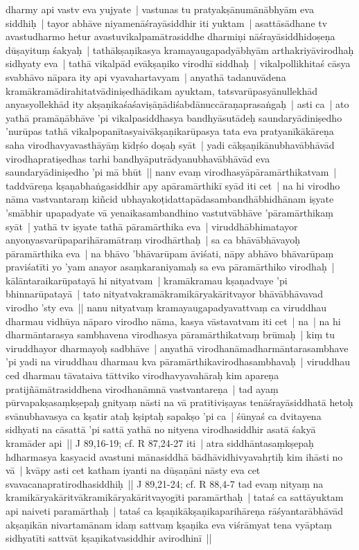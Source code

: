 \documentclass[article,12pt,a4paper]{memoir}%
\newcounter{parCount}
\begin{document}
dharmy api vastv eva yujyate | \label{thakur75-93.19} vastunas tu pratyakṣānumānābhyām eva siddhiḥ | tayor abhāve niyamenāśrayāsiddhir iti yuktam | asattāsādhane tv avastudharmo hetur avastuvikalpamātrasiddhe dharmiṇi nāśrayāsiddhidoṣeṇa dūṣayituṃ śakyaḥ | tathākṣaṇikasya kramayaugapadyābhyām arthakriyāvirodhaḥ sidhyaty eva | \label{thakur75-93.22} tathā vikalpād evākṣaṇiko virodhī siddhaḥ | vikalpollikhitaś cāsya svabhāvo nāpara ity api vyavahartavyam | anyathā tadanuvādena kramākramādirahitatvādiniṣedhādikam ayuktam, tatsvarūpasyānullekhād anyasyollekhād ity akṣaṇikaśaśaviṣāṇādiśabdānuccāraṇaprasaṅgaḥ | asti ca | ato yathā pramāṇābhāve 'pi vikalpasiddhasya bandhyāsutādeḥ saundaryādiniṣedho 'nurūpas tathā vikalpopanītasyaivākṣaṇikarūpasya tata eva pratyanīkākāreṇa saha virodhavyavasthāyāṃ kīdṛśo doṣaḥ syāt | yadi cākṣaṇikānubhavābhāvād virodhapratiṣedhas tarhi bandhyāputrādyanubhavābhāvād eva saundaryādiniṣedho 'pi mā bhūt || \label{thakur75-94.5} nanv evaṃ virodhasyāpāramārthikatvam | taddvāreṇa kṣaṇabhaṅgasiddhir apy apāramārthikī syād iti cet | \label{thakur75-94.6} na hi virodho nāma vastvantaraṃ kiñcid ubhayakoṭidattapādasambandhābhidhānam iṣyate 'smābhir upapadyate vā yenaikasambandhino vastutvābhāve 'pāramārthikaṃ syāt | yathā tv iṣyate tathā pāramārthika eva | viruddhābhimatayor anyonyasvarūpaparihāramātraṃ virodhārthaḥ | sa ca bhāvābhāvayoḥ pāramārthika eva | na bhāvo 'bhāvarūpam āviśati, nāpy abhāvo bhāvarūpaṃ praviśatīti yo 'yam anayor asaṃkaraniyamaḥ sa eva pāramārthiko virodhaḥ | kālāntaraikarūpatayā hi nityatvam | kramākramau kṣaṇadvaye 'pi bhinnarūpatayā | tato nityatvakramākramikāryakāritvayor bhāvābhāvavad virodho 'sty eva || \label{thakur75-94.14} nanu nityatvaṃ kramayaugapadyavattvaṃ ca viruddhau dharmau vidhūya nāparo virodho nāma, kasya vāstavatvam iti cet | \label{thakur75-94.15} na | na hi dharmāntarasya sambhavena virodhasya pāramārthikatvaṃ brūmaḥ | kiṃ tu viruddhayor dharmayoḥ sadbhāve | anyathā virodhanāmadharmāntarasambhave 'pi yadi na viruddhau dharmau kva pāramārthikavirodhasambhavaḥ | viruddhau ced dharmau tāvataiva tāttviko virodhavyavahāraḥ kim apareṇa pratijñāmātrasiddhena virodhanāmnā vastvantareṇa | \label{thakur75-94.20} tad ayaṃ pūrvapakṣasaṃkṣepaḥ gnityaṃ nāsti na vā pratītiviṣayas tenāśrayāsiddhatā hetoḥ svānubhavasya ca kṣatir ataḥ kṣiptaḥ sapakṣo 'pi ca | śūnyaś ca dvitayena sidhyati na cāsattā 'pi sattā yathā no nityena virodhasiddhir asatā śakyā kramāder api || J 89,16-19; cf. R 87,24-27 iti | \label{thakur75-94.25} atra siddhāntasaṃkṣepaḥ hdharmasya kasyacid avastuni mānasiddhā bādhāvidhivyavahṛtiḥ kim ihāsti no vā | kvāpy asti cet katham iyanti na dūṣaṇāni nāsty eva cet svavacanapratirodhasiddhiḥ || J 89,21-24; cf. R 88,4-7 \label{thakur75-95.1} tad evaṃ nityaṃ na kramikāryakāritvākramikāryakāritvayogīti paramārthaḥ | tataś ca sattāyuktam api naiveti paramārthaḥ | tataś ca kṣaṇikākṣaṇikaparihāreṇa rāśyantarābhāvād akṣaṇikān nivartamānam idaṃ sattvaṃ kṣaṇika eva viśrāmyat tena vyāptaṃ sidhyatīti sattvāt kṣaṇikatvasiddhir avirodhinī ||
	{}
	\pend%
      
\end{document}
